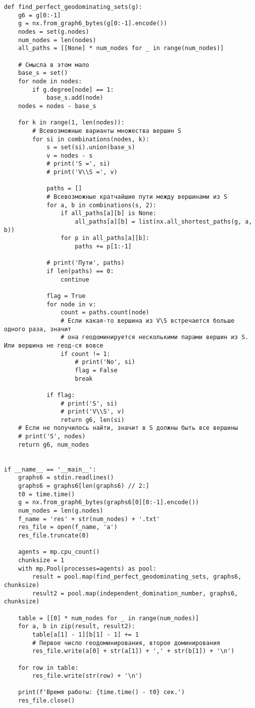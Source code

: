 \documentclass[bachelor, och, nir]{SCWorks}
\begin{document}
\begin{verbatim}
def find_perfect_geodominating_sets(g):
    g6 = g[0:-1]
    g = nx.from_graph6_bytes(g[0:-1].encode())
    nodes = set(g.nodes)
    num_nodes = len(nodes)
    all_paths = [[None] * num_nodes for _ in range(num_nodes)]

    # Смысла в этом мало
    base_s = set()
    for node in nodes:
        if g.degree[node] == 1:
            base_s.add(node)
    nodes = nodes - base_s

    for k in range(1, len(nodes)):
        # Всевозможные варианты множества вершин S
        for si in combinations(nodes, k):
            s = set(si).union(base_s)
            v = nodes - s
            # print('S =', si)
            # print('V\\S =', v)

            paths = []
            # Всевозможные кратчайшие пути между вершинами из S
            for a, b in combinations(s, 2):
                if all_paths[a][b] is None:
                    all_paths[a][b] = list(nx.all_shortest_paths(g, a, b))
                for p in all_paths[a][b]:
                    paths += p[1:-1]

            # print('Пути', paths)
            if len(paths) == 0:
                continue

            flag = True
            for node in v:
                count = paths.count(node)
                # Если какая-то вершина из V\S встречается больше одного раза, значит
                # она геодоминируется несколькими парами вершин из S. Или вершина не геод-ся вовсе
                if count != 1:
                    # print('No', si)
                    flag = False
                    break

            if flag:
                # print('S', si)
                # print('V\\S', v)
                return g6, len(si)
    # Если не получилось найти, значит в S должны быть все вершины
    # print('S', nodes)
    return g6, num_nodes


if __name__ == '__main__':
    graphs6 = stdin.readlines()
    graphs6 = graphs6[len(graphs6) // 2:]
    t0 = time.time()
    g = nx.from_graph6_bytes(graphs6[0][0:-1].encode())
    num_nodes = len(g.nodes)
    f_name = 'res' + str(num_nodes) + '.txt'
    res_file = open(f_name, 'a')
    res_file.truncate(0)

    agents = mp.cpu_count()
    chunksize = 1
    with mp.Pool(processes=agents) as pool:
        result = pool.map(find_perfect_geodominating_sets, graphs6, chunksize)
        result2 = pool.map(independent_domination_number, graphs6, chunksize)

    table = [[0] * num_nodes for _ in range(num_nodes)]
    for a, b in zip(result, result2):
        table[a[1] - 1][b[1] - 1] += 1
        # Первое число геодоминирования, второе доминирования
        res_file.write(a[0] + str(a[1]) + ',' + str(b[1]) + '\n')

    for row in table:
        res_file.write(str(row) + '\n')

    print(f'Время работы: {time.time() - t0} сек.')
    res_file.close()

    \end{verbatim}
\end{document}

